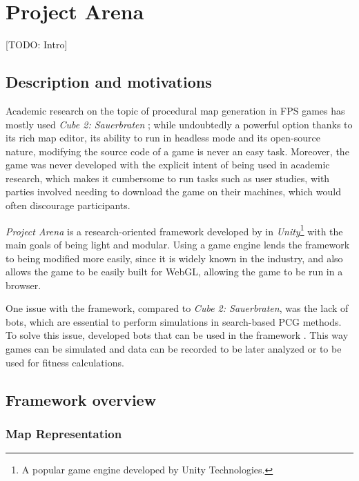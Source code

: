 \documentclass{Configuration_Files/PoliMi3i_thesis}
\begin{document}
\section{Project Arena}
\label{ch:project_arena}

[TODO: Intro]

\subsection{Description and motivations}
\label{sec:pa_description}
Academic research on the topic of procedural map generation in FPS games has mostly used \textit{Cube 2: Sauerbraten} \cite{cardamone_evolving_2011}\cite{lanzi_evolving_2014}\cite{loiacono_fight_2017}; while undoubtedly a powerful option thanks to its rich map editor, its ability to run in headless mode and its open-source nature, modifying the source code of a game is never an easy task. Moreover, the game was never developed with the explicit intent of being used in academic research, which makes it cumbersome to run tasks such as user studies, with parties involved needing to download the game on their machines, which would often discourage participants.

\textit{Project Arena} \cite{ballabio_online_2018} is a research-oriented framework developed by \citeauthor{ballabio_online_2018} in \textit{Unity}\footnote{A popular game engine developed by Unity Technologies.} with the main goals of being light and modular. Using a game engine lends the framework to being modified more easily, since it is widely known in the industry, and also allows the game to be easily built for WebGL, allowing the game to be run in a browser. 

One issue with the framework, compared to \textit{Cube 2: Sauerbraten}, was the lack of bots, which are essential to perform simulations in search-based PCG methods. To solve this issue, \citeauthor{bari_evolutionary-based_2023} developed bots that can be used in the framework \cite{bari_evolutionary-based_2023}. This way games can be simulated and data can be recorded to be later analyzed or to be used for fitness calculations.

\subsection{Framework overview}
\label{sec:pa_overview}

\subsubsection{Map Representation}
\label{subsec:map_representation}
\end{document}
